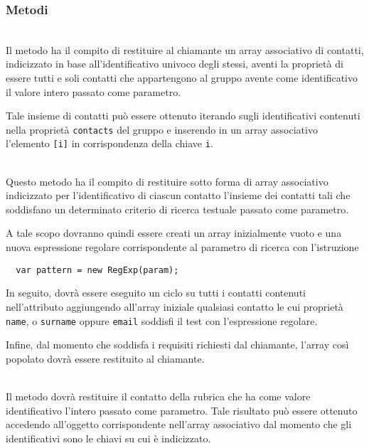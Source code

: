 \subsubsection*{Metodi}
\begin{description}

\item{}\\
Il metodo ha il compito di restituire al chiamante un array associativo di contatti, indicizzato in base all'identificativo univoco degli stessi, aventi la proprietà di essere tutti e soli contatti che appartengono al gruppo avente come identificativo il valore intero passato come parametro.

Tale insieme di contatti può essere ottenuto iterando sugli identificativi contenuti nella proprietà \verb'contacts' del gruppo e inserendo in un array associativo l'elemento \verb'[i]' in corrispondenza della chiave \verb'i'.

\item{}\\
Questo metodo ha il compito di restituire sotto forma di array associativo indicizzato per l'identificativo di ciascun contatto l'insieme dei contatti tali che soddisfano un determinato criterio di ricerca testuale passato come parametro.

A tale scopo dovranno quindi essere creati un array inizialmente vuoto e una nuova espressione regolare corrispondente al parametro di ricerca con l'istruzione
\begin{verbatim}
  var pattern = new RegExp(param);
\end{verbatim}

In seguito, dovrà essere eseguito un ciclo su tutti i contatti contenuti nell'attributo  aggiungendo all'array iniziale qualsiasi contatto le cui proprietà \verb'name', o \verb'surname' oppure \verb'email' soddisfi il test con l'espressione regolare.

Infine, dal momento che soddisfa i requisiti richiesti dal chiamante, l'array così popolato dovrà essere restituito al chiamante.

\item{}\\
Il metodo dovrà restituire il contatto della rubrica che ha come valore identificativo l'intero passato come parametro. Tale risultato può essere ottenuto accedendo all'oggetto corrispondente nell'array associativo  dal momento che gli identificativi sono le chiavi su cui è indicizzato.


\end{description}
